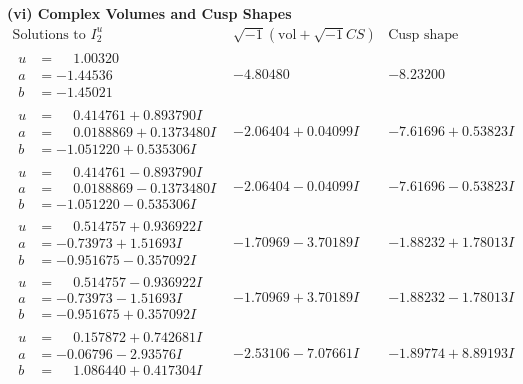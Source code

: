 \documentclass[1p]{elsarticle_modified}
\theoremstyle{definition}
\newcommand{\I}{\sqrt{-1}}
\begin{document}
\newpage\flushleft \textbf{(vi) Complex Volumes and Cusp Shapes}
$$\begin{array}{c|c|c}  
\text{Solutions to }I^u_{2}& \I (\text{vol} + \sqrt{-1}CS) & \text{Cusp shape}\\
 \hline 
\begin{aligned}
u &= \phantom{-}1.00320\phantom{ +0.000000I} \\
a &= -1.44536\phantom{ +0.000000I} \\
b &= -1.45021\phantom{ +0.000000I}\end{aligned}
 & -4.80480\phantom{ +0.000000I} & -8.23200\phantom{ +0.000000I} \\ \hline\begin{aligned}
u &= \phantom{-}0.414761 + 0.893790 I \\
a &= \phantom{-}0.0188869 + 0.1373480 I \\
b &= -1.051220 + 0.535306 I\end{aligned}
 & -2.06404 + 0.04099 I & -7.61696 + 0.53823 I \\ \hline\begin{aligned}
u &= \phantom{-}0.414761 - 0.893790 I \\
a &= \phantom{-}0.0188869 - 0.1373480 I \\
b &= -1.051220 - 0.535306 I\end{aligned}
 & -2.06404 - 0.04099 I & -7.61696 - 0.53823 I \\ \hline\begin{aligned}
u &= \phantom{-}0.514757 + 0.936922 I \\
a &= -0.73973 + 1.51693 I \\
b &= -0.951675 - 0.357092 I\end{aligned}
 & -1.70969 - 3.70189 I & -1.88232 + 1.78013 I \\ \hline\begin{aligned}
u &= \phantom{-}0.514757 - 0.936922 I \\
a &= -0.73973 - 1.51693 I \\
b &= -0.951675 + 0.357092 I\end{aligned}
 & -1.70969 + 3.70189 I & -1.88232 - 1.78013 I \\ \hline\begin{aligned}
u &= \phantom{-}0.157872 + 0.742681 I \\
a &= -0.06796 - 2.93576 I \\
b &= \phantom{-}1.086440 + 0.417304 I\end{aligned}
 & -2.53106 - 7.07661 I & -1.89774 + 8.89193 I \\ \hline\begin{aligned}

\end{aligned}
\end{array}$$
\end{document}
